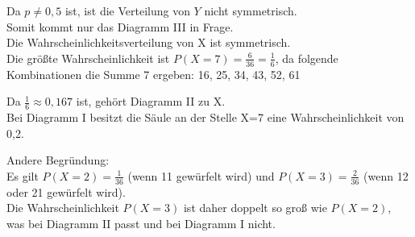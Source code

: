 \documentclass[10pt]{article}
\begin{document}
Da $p \neq 0,5$ ist, ist die Verteilung von $Y$ nicht symmetrisch.\\
Somit kommt nur das Diagramm III in Frage.\\
Die Wahrscheinlichkeitsverteilung von X ist symmetrisch.\\
Die größte Wahrscheinlichkeit ist $P(X=7)=\frac{6}{36}=\frac{1}{6}$, da folgende Kombinationen die Summe 7 ergeben: 16, 25, 34, 43, 52, 61

Da $\frac{1}{6} \approx 0,167$ ist, gehört Diagramm II zu X.\\
Bei Diagramm I besitzt die Säule an der Stelle X=7 eine Wahrscheinlichkeit von 0,2.

Andere Begründung:\\
Es gilt $P(X=2)=\frac{1}{36}$ (wenn 11 gewürfelt wird) und $P(X=3)=\frac{2}{36}$ (wenn 12 oder 21 gewürfelt wird).\\
Die Wahrscheinlichkeit $P(X=3)$ ist daher doppelt so groß wie $P(X=2)$, was bei Diagramm II passt und bei Diagramm I nicht.
\end{document}

